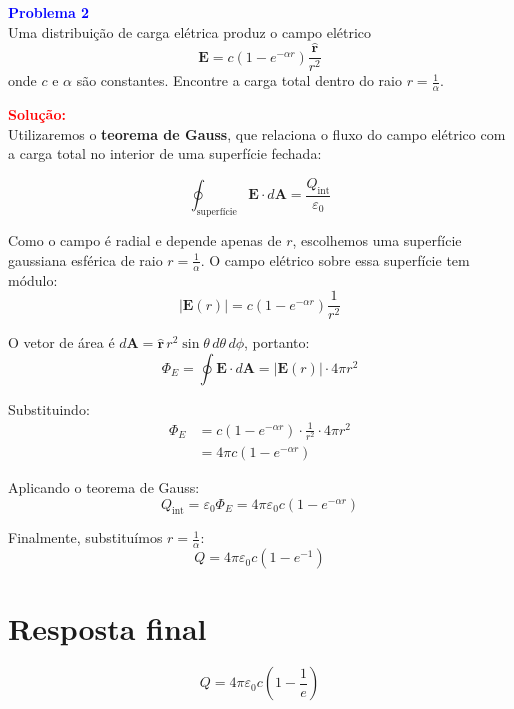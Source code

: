 \documentclass[a4paper,12pt]{article}
\begin{document}
\begin{flushleft}
\textbf{\textcolor{blue}{\Large Problema 2}}\\

Uma distribuição de carga elétrica produz o campo elétrico
\begin{equation}
\mathbf{E} = c \left( 1 - e^{-\alpha r} \right) \frac{\hat{\mathbf{r}}}{r^2}
\end{equation}
onde \(c\) e \(\alpha\) são constantes. Encontre a carga total dentro do raio \(r = \frac{1}{\alpha}\).

\textcolor{red}{\textbf{Solução:}}\\

Utilizaremos o \textbf{teorema de Gauss}, que relaciona o fluxo do campo elétrico com a carga total no interior de uma superfície fechada:

\begin{equation}
\oint_{\text{superfície}} \mathbf{E} \cdot d\mathbf{A} = \frac{Q_{\text{int}}}{\varepsilon_0}
\end{equation}

Como o campo é radial e depende apenas de \(r\), escolhemos uma superfície gaussiana esférica de raio \(r = \frac{1}{\alpha}\). O campo elétrico sobre essa superfície tem módulo:
\begin{equation}
|\mathbf{E}(r)| = c \left( 1 - e^{-\alpha r} \right) \frac{1}{r^2}
\end{equation}

O vetor de área é \(d\mathbf{A} = \hat{\mathbf{r}}\, r^2 \sin\theta\, d\theta\, d\phi\), portanto:
\begin{equation}
\Phi_E = \oint \mathbf{E} \cdot d\mathbf{A} = |\mathbf{E}(r)| \cdot 4\pi r^2
\end{equation}

Substituindo:
\begin{align}
\Phi_E &= c \left(1 - e^{-\alpha r} \right) \cdot \frac{1}{r^2} \cdot 4\pi r^2 \\
&= 4\pi c \left(1 - e^{-\alpha r} \right)
\end{align}

Aplicando o teorema de Gauss:
\begin{equation}
Q_{\text{int}} = \varepsilon_0 \Phi_E = 4\pi \varepsilon_0 c \left(1 - e^{-\alpha r} \right)
\end{equation}

Finalmente, substituímos \(r = \frac{1}{\alpha}\):
\begin{equation}
Q = 4\pi \varepsilon_0 c \left(1 - e^{-1} \right)
\end{equation}

\section*{Resposta final}

\begin{equation}
\boxed{Q = 4\pi \varepsilon_0 c \left(1 - \frac{1}{e} \right)}
\end{equation}

\end{flushleft}
\end{document}
